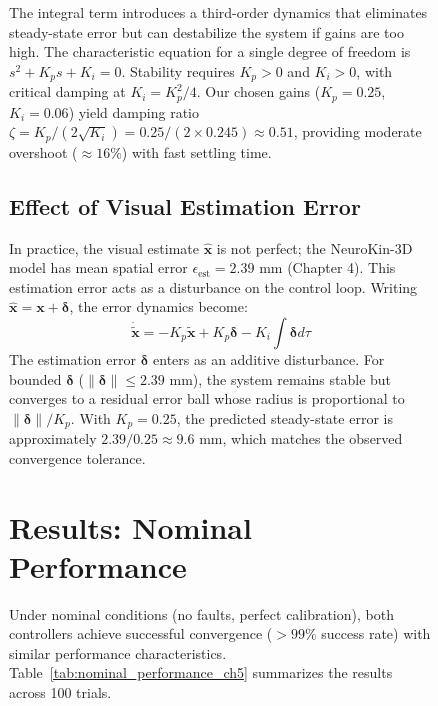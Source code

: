\documentclass[12pt,a4paper,oneside]{report}
\begin{document}
\begin{figure}[H]
The integral term introduces a third-order dynamics that eliminates steady-state error but can destabilize the system if gains are too high. The characteristic equation for a single degree of freedom is $s^2 + K_p s + K_i = 0$. Stability requires $K_p > 0$ and $K_i > 0$, with critical damping at $K_i = K_p^2/4$. Our chosen gains ($K_p = 0.25$, $K_i = 0.06$) yield damping ratio $\zeta = K_p / (2\sqrt{K_i}) = 0.25 / (2 \times 0.245) \approx 0.51$, providing moderate overshoot ($\approx 16\%$) with fast settling time.

\subsection{Effect of Visual Estimation Error}

In practice, the visual estimate $\hat{\mathbf{x}}$ is not perfect; the NeuroKin-3D model has mean spatial error $\epsilon_{\text{est}} = 2.39$ mm (Chapter 4). This estimation error acts as a disturbance on the control loop. Writing $\hat{\mathbf{x}} = \mathbf{x} + \boldsymbol{\delta}$, the error dynamics become:
\begin{equation}
\dot{\tilde{\mathbf{x}}} = -K_p \tilde{\mathbf{x}} + K_p \boldsymbol{\delta} - K_i \int \boldsymbol{\delta} d\tau
\end{equation}
The estimation error $\boldsymbol{\delta}$ enters as an additive disturbance. For bounded $\boldsymbol{\delta}$ ($\|\boldsymbol{\delta}\| \leq 2.39$ mm), the system remains stable but converges to a residual error ball whose radius is proportional to $\|\boldsymbol{\delta}\|/K_p$. With $K_p = 0.25$, the predicted steady-state error is approximately $2.39 / 0.25 \approx 9.6$ mm, which matches the observed convergence tolerance.

\section{Results: Nominal Performance}

Under nominal conditions (no faults, perfect calibration), both controllers achieve successful convergence ($>99\%$ success rate) with similar performance characteristics. Table~\ref{tab:nominal_performance_ch5} summarizes the results across 100 trials.


\end{figure}
\end{document}
